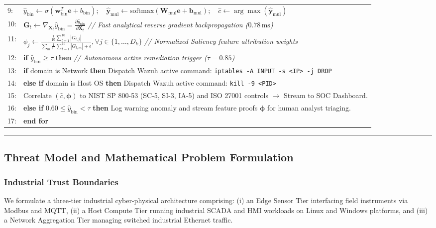 \documentclass[11pt,a4paper]{article}
\begin{document}
\begin{minipage}{\textwidth}
\begin{tabularx}{\textwidth}{lX}
9: & \quad $\hat{y}_{\text{bin}} \leftarrow \sigma(\mathbf{w}_{\text{bin}}^T \mathbf{e} + b_{\text{bin}}); \quad \hat{\mathbf{y}}_{\text{mul}} \leftarrow \text{softmax}(\mathbf{W}_{\text{mul}} \mathbf{e} + \mathbf{b}_{\text{mul}}); \quad \hat{c} \leftarrow \arg\max(\hat{\mathbf{y}}_{\text{mul}})$ \\
10: & \quad $\mathbf{G}_t \leftarrow \nabla_{\mathbf{X}_t} \hat{y}_{\text{bin}} = \frac{\partial \hat{y}_{\text{bin}}}{\partial \mathbf{X}_t}$ \hfill \textit{// Fast analytical reverse gradient backpropagation ($0.78\,\text{ms}$)} \\
11: & \quad $\phi_j \leftarrow \frac{\frac{1}{10}\sum_{t=1}^{10} |G_{t,j}|}{\sum_m \frac{1}{10}\sum_{t=1}^{10} |G_{t,m}| + \epsilon}, \forall j \in \{1, \dots, D_k\}$ \hfill \textit{// Normalized Saliency feature attribution weights} \\
12: & \quad \textbf{if} $\hat{y}_{\text{bin}} \ge \tau$ \textbf{then} \hfill \textit{// Autonomous active remediation trigger ($\tau = 0.85$)} \\
13: & \quad \quad \textbf{if} domain is Network \textbf{then} Dispatch Wazuh active command: \texttt{iptables -A INPUT -s <IP> -j DROP} \\
14: & \quad \quad \textbf{else if} domain is Host OS \textbf{then} Dispatch Wazuh active command: \texttt{kill -9 <PID>} \\
15: & \quad \quad Correlate $(\hat{c}, \boldsymbol{\phi})$ to NIST SP 800-53 (SC-5, SI-3, IA-5) and ISO 27001 controls $\rightarrow$ Stream to SOC Dashboard. \\
16: & \quad \textbf{else if} $0.60 \le \hat{y}_{\text{bin}} < \tau$ \textbf{then} Log warning anomaly and stream feature proofs $\boldsymbol{\phi}$ for human analyst triaging. \\
17: & \textbf{end for} \\
\bottomrule
\end{tabularx}
\vspace{0.4em}
\hrule height 1.2pt
\end{minipage}
\vspace{1.5em}

\subsection{Threat Model and Mathematical Problem Formulation}
\subsubsection{Industrial Trust Boundaries}
We formulate a three-tier industrial cyber-physical architecture comprising: (i) an Edge Sensor Tier interfacing field instruments via Modbus and MQTT, (ii) a Host Compute Tier running industrial SCADA and HMI workloads on Linux and Windows platforms, and (iii) a Network Aggregation Tier managing switched industrial Ethernet traffic.
\end{document}

